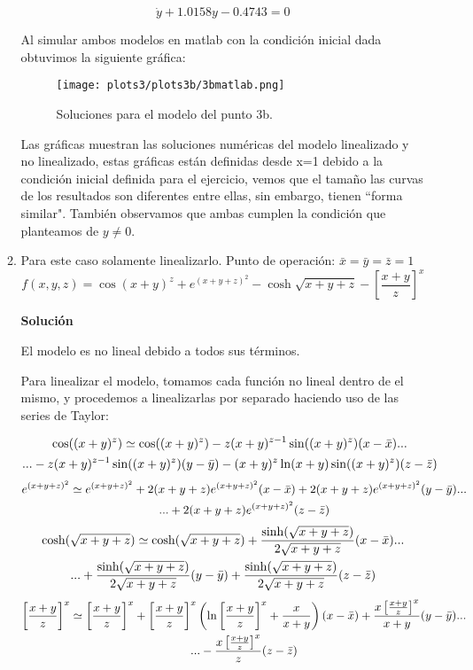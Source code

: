 \documentclass[letterpaper, 12pt]{article}
\begin{document}
\begin{enumerate}
\begin{enumerate}
\begin{equation}
    \dot{y}+1.0158y-0.4743=0
\end{equation}

Al simular ambos modelos en matlab con la condición inicial dada obtuvimos la siguiente gráfica:
\begin{figure}[H]
    \centering
    \texttt{[image: plots3/plots3b/3bmatlab.png]}
    \caption{Soluciones para el modelo del punto 3b.}
    \label{3b}
\end{figure}

Las gráficas muestran las soluciones numéricas del modelo linealizado y no linealizado, estas gráficas están definidas desde x=1 debido a la condición inicial definida para el ejercicio, vemos que el tamaño las curvas de los resultados son diferentes entre ellas, sin embargo, tienen ``forma similar". También observamos que ambas cumplen la condición que planteamos de $y\neq 0$. 

\item Para este caso solamente linealizarlo. Punto de operación: $ \bar{x} = \bar{y} = \bar{z} = 1$
\begin{equation}
    f(x,y,z)=\cos(x+y)^z+e^{(x+y+z)^2}-\cosh{\sqrt{x+y+z}-\left[\frac{x+y}{z}\right]^x}
    \label{p3cec}
\end{equation}

\textbf{Solución}

El modelo es no lineal debido a todos sus términos.

Para linealizar el modelo, tomamos cada función no lineal dentro de el mismo, y procedemos a linealizarlas por separado haciendo uso de las series de Taylor:

\begin{multline}
    \notag
    \cos((x+y)^z)\simeq \cos((x+y)^z)-z(x+y)^{z-1} \sin((x+y)^z)(x-\bar{x}) ...
    \\...-z(x+y)^{z-1} \sin((x+y)^z)(y-\bar{y})
    -(x+y)^z \ln(x+y) \sin((x+y)^z)(z-\bar{z})
\end{multline}
\begin{multline}
    \notag
    e^{(x+y+z)^2}\simeq e^{(x+y+z)^2}+2(x+y+z)e^{(x+y+z)^2}(x-\bar{x})+2(x+y+z)e^{(x+y+z)^2}(y-\bar{y})...
    \\...+2(x+y+z)e^{(x+y+z)^2}(z-\bar{z})
\end{multline}
\begin{multline}
    \notag
    \cosh(\sqrt{x+y+z})\simeq \cosh(\sqrt{x+y+z})+\frac{\sinh(\sqrt{x+y+z})}{2\sqrt{x+y+z}}(x-\bar{x})...
    \\...+\frac{\sinh(\sqrt{x+y+z})}{2\sqrt{x+y+z}}(y-\bar{y})+\frac{\sinh(\sqrt{x+y+z})}{2\sqrt{x+y+z}}(z-\bar{z})
\end{multline}
\begin{multline}
    \notag
    \left[\frac{x+y}{z}\right]^x\simeq \left[\frac{x+y}{z}\right]^x +\left[\frac{x+y}{z}\right]^x \left(\ln\left[\frac{x+y}{z}\right]^x+\frac{x}{x+y}\right)(x-\bar{x})+\frac{x\left[\frac{x+y}{z}\right]^x}{x+y}(y-\bar{y})...
    \\ ...-\frac{x\left[\frac{x+y}{z}\right]^x}{z}(z-\bar{z})
\end{multline}


\end{enumerate}
\end{enumerate}
\end{document}
